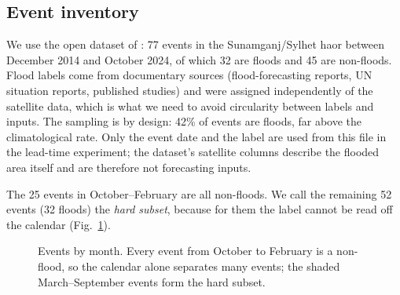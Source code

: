 \subsection{Event inventory}
We use the open dataset of \cite{koli2026dataset}: 77 events in the Sunamganj/Sylhet haor between December 2014 and October 2024, of which 32 are floods and 45 are non-floods. Flood labels come from documentary sources (flood-forecasting reports, UN situation reports, published studies) and were assigned independently of the satellite data, which is what we need to avoid circularity between labels and inputs. The sampling is by design: 42\% of events are floods, far above the climatological rate. Only the event date and the label are used from this file in the lead-time experiment; the dataset's satellite columns describe the flooded area itself and are therefore not forecasting inputs.

The 25 events in October--February are all non-floods. We call the remaining 52 events (32 floods) the \emph{hard subset}, because for them the label cannot be read off the calendar (Fig.~\ref{fig:season}).

\begin{figure}[t]
\centering{}
\caption{Events by month. Every event from October to February is a non-flood, so the calendar alone separates many events; the shaded March--September events form the hard subset.}\label{fig:season}
\end{figure}

